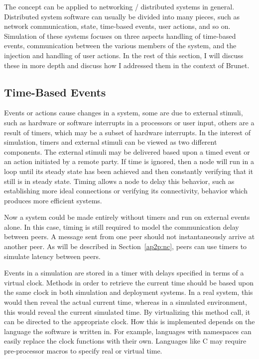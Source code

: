 The concept can be applied to networking / distributed systems in general.
Distributed system software can usually be divided into many pieces, such as
network communication, state, time-based events, user actions, and so on.
Simulation of these systems focuses on three aspects handling of time-based
events, communication between the various members of the system, and the
injection and handling of user actions.  In the rest of this section, I will
discuss these in more depth and discuss how I addressed them in the context of
Brunet.

\subsection{Time-Based Events}

Events or actions cause changes in a system, some are due to external stimuli,
such as hardware or software interrupts in a processors or user input, others
are a result of timers, which may be a subset of hardware interrupts.  In the
interest of simulation, timers and external stimuli can be viewed as two
different components.  The external stimuli may be delivered based upon a timed
event or an action initiated by a remote party.  If time is ignored, then a
node will run in a loop until its steady state has been achieved and then
constantly verifying that it still is in steady state.  Timing allows a node to
delay this behavior, such as establishing more ideal connections or verifying
its connectivity, behavior which produces more efficient systems.

Now a system could be made entirely without timers and run on external events
alone.  In this case, timing is still required to model the communication delay
between peers.  A message sent from one peer should not instantaneously arrive
at another peer.  As will be described in Section~\ref{ap2p:nc}, peers can use
timers to simulate latency between peers.

Events in a simulation are stored in a timer with delays specified in terms of
a virtual clock.  Methods in order to retrieve the current time should be based
upon the same clock in both simulation and deployment systems.  In a real
system, this would then reveal the actual current time, whereas in a simulated
environment, this would reveal the current simulated time.  By virtualizing
this method call, it can be directed to the appropriate clock.  How this is
implemented depends on the language the software is written in.  For example,
languages with namespaces can easily replace the clock functions with their
own.  Languages like C may require pre-processor macros to specify real or
virtual time.

